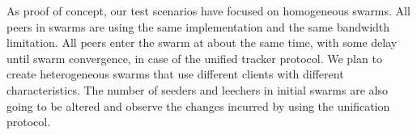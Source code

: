 As proof of concept, our test scenarios have focused on homogeneous swarms.
All peers in swarms are using the same implementation and the same bandwidth
limitation. All peers enter the swarm at about the same time, with some delay
until swarm convergence, in case of the unified tracker protocol. We plan to
create heterogeneous swarms that use different clients with different
characteristics. The number of seeders and leechers in initial swarms are also
going to be altered and observe the changes incurred by using the unification
protocol.
